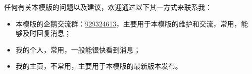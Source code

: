 \begin{conclusion}
    任何有关本模版的问题以及建议，欢迎通过以下其一方式来联系我：
    \begin{itemize}
        \item 本模版的企鹅交流群：\href{https://jq.qq.com/?_wv=1027&k=eA9mGWmS}{929324613}，主要用于本模版的维护和交流，常用，能够及时回复消息；
        \item 我的个人\href{https://space.bilibili.com/326100515}{}，常用，一般能很快看到消息；
        \item 我的\href{https://space.bilibili.com/326100515}{}主页，不常用，主要用于本模版的最新版本发布。
    \end{itemize}
\end{conclusion}